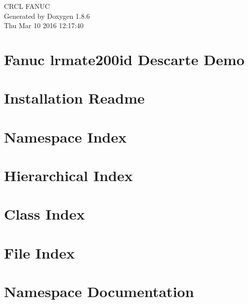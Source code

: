 \documentclass[twoside]{book}
\newcommand{\clearemptydoublepage}{%
  \newpage{\pagestyle{empty}\cleardoublepage}%
}
\begin{document}
\hypersetup{pageanchor=false}
\begin{titlepage}
\vspace*{7cm}
\begin{center}%
{\Large C\-R\-C\-L F\-A\-N\-U\-C }\\
\vspace*{1cm}
{\large Generated by Doxygen 1.8.6}\\
\vspace*{0.5cm}
{\small Thu Mar 10 2016 12:17:40}\\
\end{center}
\end{titlepage}
\clearemptydoublepage
\tableofcontents
\clearemptydoublepage
{}
\hypersetup{pageanchor=true}

\chapter{Fanuc lrmate200id Descarte Demo}
\label{md_Readme}
\hypertarget{md_Readme}{}

\chapter{Installation Readme}
\label{md_Installation}
\hypertarget{md_Installation}{}

\chapter{Namespace Index}

\chapter{Hierarchical Index}

\chapter{Class Index}

\chapter{File Index}

\chapter{Namespace Documentation}




\end{document}
